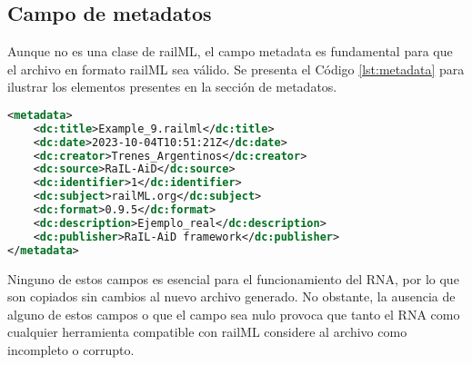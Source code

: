 \subsection{Campo de metadatos}
    \label{sec:metadata}

    Aunque no es una clase de railML, el campo metadata es fundamental para que el archivo en formato railML sea válido. Se presenta el Código \ref{lst:metadata} para ilustrar los elementos presentes en la sección de metadatos.
    
    \begin{lstlisting}[language = XML, caption = Campo de metadatos, label = {lst:metadata}]
<metadata>
    <dc:title>Example_9.railml</dc:title>
    <dc:date>2023-10-04T10:51:21Z</dc:date>
    <dc:creator>Trenes_Argentinos</dc:creator>
    <dc:source>RaIL-AiD</dc:source>
    <dc:identifier>1</dc:identifier>
    <dc:subject>railML.org</dc:subject>
    <dc:format>0.9.5</dc:format>
    <dc:description>Ejemplo_real</dc:description>
    <dc:publisher>RaIL-AiD framework</dc:publisher>
</metadata>
    \end{lstlisting}

    Ninguno de estos campos es esencial para el funcionamiento del RNA, por lo que son copiados sin cambios al nuevo archivo generado. No obstante, la ausencia de alguno de estos campos o que el campo sea nulo provoca que tanto el RNA como cualquier herramienta compatible con railML considere al archivo como incompleto o corrupto.